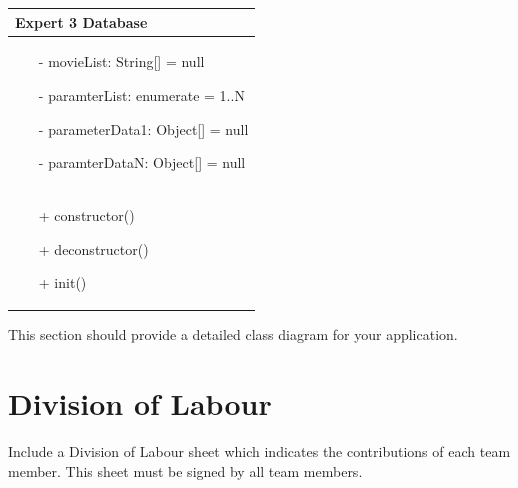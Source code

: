 \documentclass[]{article}
\begin{document}
\begin{table}[H]
\centering
\begin{tabular}{|>{\centering\arraybackslash}p{10cm}|}
\hline
Expert 3 Database\\
\hline
\begin{itemize}
\item[-] movieList: String[] = null
\item[-] paramterList: enumerate = 1..N
\item[-] parameterData1: Object[] = null
\item[-] paramterDataN: Object[] = null
\end{itemize}
\\
\hline
\begin{itemize}
\item[+] constructor()
\item[+] deconstructor()
\item[+] init()
\end{itemize}
\\
\hline
\end{tabular}
\end{table}
This section should provide a detailed class diagram for your application.

\appendix
\section{Division of Labour}
\label{sec:division_of_labour}
Include a Division of Labour sheet which indicates the contributions of each team member. This sheet must be signed by all team members.

\newpage
\end{document}

